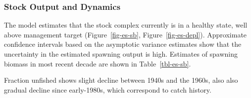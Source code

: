 \documentclass[
]{scrartcl}
\begin{document}
\subsubsection{Stock Output and
Dynamics}\label{stock-output-and-dynamics}

The model estimates that the stock complex currently is in a healthy
state, well above management target (Figure~\ref{fig-es-sb},
Figure~\ref{fig-es-depl}). Approximate confidence intervals based on the
asymptotic variance estimates show that the uncertainty in the estimated
spawning output is high. Estimates of spawning biomass in most recent
decade are shown in Table~\ref{tbl-es-sb}.

Fraction unfished shows slight decline between 1940s and the 1960s, also
also gradual decline since early-1980s, which correspond to catch
history.

\begingroup
\fontsize{9.0pt}{10.8pt}\selectfont
\end{document}
